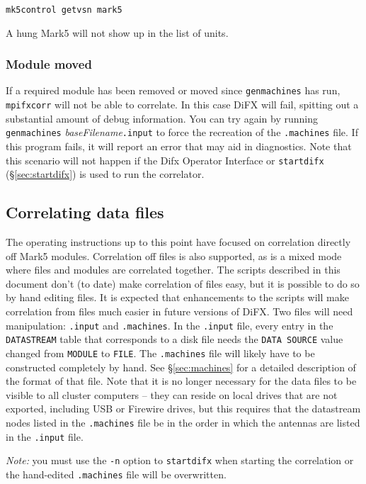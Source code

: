 {\tt mk5control getvsn mark5}

\noindent A hung Mark5 will not show up in the list of units.

\subsubsection{Module moved}
If a required module has been removed or moved since {\tt genmachines} has run, {\tt mpifxcorr} will not be able to correlate.
In this case DiFX will fail, spitting out a substantial amount of debug information.
You can try again by running {\tt genmachines} {\em baseFilename}{\tt .input} to force the recreation of the {\tt .machines} file.
If this program fails, it will report an error that may aid in diagnostics.
Note that this scenario will not happen if the Difx Operator Interface or {\tt startdifx} (\S\ref{sec:startdifx}) is used to run the correlator.

\subsection{Correlating data files} \label{sec:datafiles}

The operating instructions up to this point have focused on correlation directly off Mark5 modules.
Correlation off files is also supported, as is a mixed mode where files and modules are correlated together.
The scripts described in this document don't (to date) make correlation of files easy, but it is possible to do so by hand editing files.
It is expected that enhancements to the scripts will make correlation from files much easier in future versions of DiFX.
Two files will need manipulation: {\tt .input} and {\tt .machines}.
In the {\tt .input} file, every entry in the {\tt DATASTREAM} table that corresponds to a disk file needs the {\tt DATA SOURCE} value changed from {\tt MODULE} to {\tt FILE}.
The {\tt .machines} file will likely have to be constructed completely by hand.
See \S\ref{sec:machines} for a detailed description of the format of that file.
Note that it is no longer necessary for the data files to be visible to all cluster computers -- they can reside on local drives that are not exported, including USB or Firewire drives, but this requires that the datastream nodes listed in the {\tt .machines} file be in the order in which the antennas are listed in the {\tt .input} file.

\noindent 
{\em Note:} you must use the {\tt -n} option to {\tt startdifx} when starting the correlation or the hand-edited {\tt .machines} file will be overwritten.


